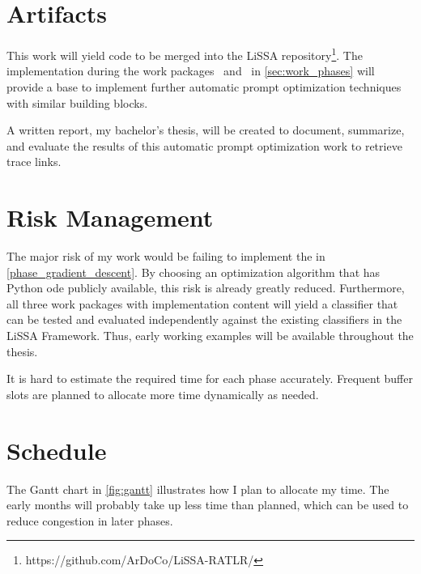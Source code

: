 \section{Artifacts}
\label{sec:work_artifacts}
This work will yield code to be merged into the LiSSA repository\footnote{https://github.com/ArDoCo/LiSSA-RATLR/}.
The implementation during the work packages~ and~ in \autoref{sec:work_phases} will provide a base to implement further automatic prompt optimization techniques with similar building blocks.

A written report, my bachelor's thesis, will be created to document, summarize, and evaluate the results of this automatic prompt optimization work to retrieve trace links.


\section{Risk Management}
\label{sec:work_risks}
The major risk of my work would be failing to implement the  in \autoref{phase_gradient_descent}.
By choosing an optimization algorithm that has Python ode publicly available, this risk is already greatly reduced.
Furthermore, all three work packages with implementation content will yield a classifier that can be tested and evaluated independently against the existing classifiers in the LiSSA Framework.
Thus, early working examples will be available throughout the thesis.

It is hard to estimate the required time for each phase accurately.
Frequent buffer slots are planned to allocate more time dynamically as needed.




\section{Schedule}
\label{sec:work_gant}
The Gantt chart in \autoref{fig:gantt} illustrates how I plan to allocate my time.
The early months will probably take up less time than planned, which can be used to reduce congestion in later phases.


